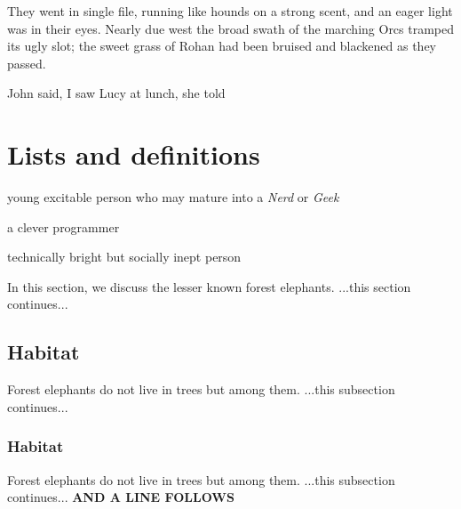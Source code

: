 \documentclass{article}
\begin{document}
\par

\begin{center}
They went in single file, running like hounds on a strong scent,
and an eager light was in their eyes. Nearly due west the broad
swath of the marching {\fontsize{4}{5}\selectfont Orcs tramped}
 its ugly slot; the sweet grass
of Rohan had been bruised and blackened as they passed.

\end{center}

\par
John said, I saw Lucy at lunch, she told
\section{Lists and definitions}

\begin{description}[style=unboxed, labelwidth=\linewidth, font =\sffamily\itshape\bfseries, listparindent =0pt, before =\sffamily]

\item[ Dweeb]

young excitable person who may mature
    into a \emph{Nerd}
 or \emph{Geek}


\item[ Hacker]

a clever programmer

\item[ Nerd]

technically bright but socially inept person
\end{description}

\par
In this section, we discuss the lesser known forest elephants.
...this section continues...
\subsection{Habitat}

\par
Forest elephants do not live in trees but among them.
...this subsection continues... 
\subsubsection{Habitat}

\par
Forest elephants do not live in trees but among them.
...this subsection continues...  \textbf{AND A LINE FOLLOWS}
\end{document}
